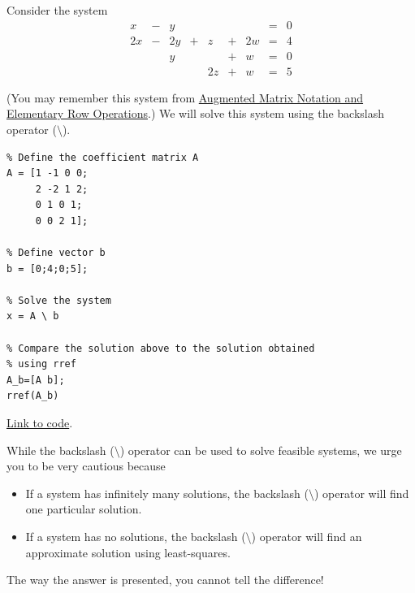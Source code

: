 \documentclass{ximera}
\begin{document}
\begin{example}\label{temp:systems1}
Consider the system
\begin{equation}
\begin{array}{ccccccccc}
      x &- &y&&&&&= &0 \\
     2x& -&2y&+&z&+&2w&=&4\\
     & &y&&&+&w&=&0\\
     & &&&2z&+&w&=&5
    \end{array}
    \end{equation}
 
 (You may remember this system from \href{https://ximera.osu.edu/linearalgebrav3/LinearAlgebraInteractiveIntro/SYS-0020/main}{Augmented Matrix Notation and Elementary Row Operations}.)  We will solve this system using the backslash operator ($\setminus$).  
\begin{verbatim}
% Define the coefficient matrix A
A = [1 -1 0 0;
     2 -2 1 2;
     0 1 0 1;
     0 0 2 1];
 
% Define vector b
b = [0;4;0;5];
 
% Solve the system
x = A \ b
 
% Compare the solution above to the solution obtained
% using rref
A_b=[A b];
rref(A_b)
\end{verbatim}
 
\href{https://sagecell.sagemath.org/?z=eJxVj8EOgjAQRO9N-g9zIdEDSUv0RDgQ_QOPaAzFok2ANaUQ_Hu7UWLc20zf7GwTHG3rBovwsGjItq1rnB0C-jp4t6CUokSBSiPVUFC5FODJkGbQyFatwM_6J1VE9CVqKZK1Y7ZNIA8jheGdKt_lKt-v0Im6-XPH-BqD7SHFErESZ04wcaD-WfsvQ90UHA2oDXGM_l0yoY6VN45Noxvu8N628TNXU1QlDJeys4nG9g1f4kXS&lang=octave&interacts=eJyLjgUAARUAuQ==}{Link to code}.
 
\end{example}
 
\begin{warning}
  While the backslash ($\setminus$) operator can be used to solve feasible systems, we urge you to be very cautious because
\begin{itemize}
  \item If a system has infinitely many solutions, the backslash ($\setminus$) operator will find one particular solution.
  \item If a system has no solutions, the backslash ($\setminus$) operator will find an approximate solution using least-squares. 
\end{itemize}
The way the answer is presented, you cannot tell the difference!
\end{warning}
 
\end{document}
